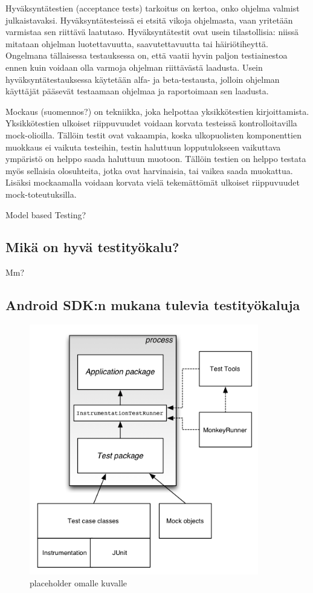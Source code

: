 Hyväksyntätestien (acceptance tests) tarkoitus on kertoa, onko ohjelma valmist julkaistavaksi. Hyväksyntätesteissä ei etsitä vikoja ohjelmasta, vaan yritetään varmistaa sen riittävä laatutaso. Hyväksyntätestit ovat usein tilastollisia: niissä mitataan ohjelman luotettavuutta, saavutettavuutta tai häiriötiheyttä. Ongelmana tällaisessa testauksessa on, että vaatii hyvin paljon testiainestoa ennen kuin voidaan olla varmoja ohjelman riittävästä laadusta. Usein hyväksyntätestauksessa käytetään alfa- ja beta-testausta, jolloin ohjelman käyttäjät pääsevät testaamaan ohjelmaa ja raportoimaan sen laadusta.\cite[421-423]{testing}

Mockaus (suomennos?) on tekniikka, joka helpottaa yksikkötestien kirjoittamista. Yksikkötestien ulkoiset riippuvuudet voidaan korvata testeissä kontrolloitavilla mock-olioilla. Tällöin testit ovat vakaampia, koska ulkopuolisten komponenttien muokkaus ei vaikuta testeihin, testin haluttuun lopputulokseen vaikuttava ympäristö on helppo saada haluttuun muotoon. Tällöin testien on helppo testata myös sellaisia olosuhteita, jotka ovat harvinaisia, tai vaikea saada muokattua. Lisäksi mockaamalla voidaan korvata vielä tekemättömät ulkoiset riippuvuudet mock-toteutuksilla. \cite{mocking}

Model based Testing?

\subsection{Mikä on hyvä testityökalu?}

Mm?

\subsection{Android SDK:n mukana tulevia testityökaluja}

\begin{figure}[htb]
\includegraphics[width=100mm]{test_framework.png}
\caption{placeholder omalle kuvalle} \label{test_framework}
\end{figure}

